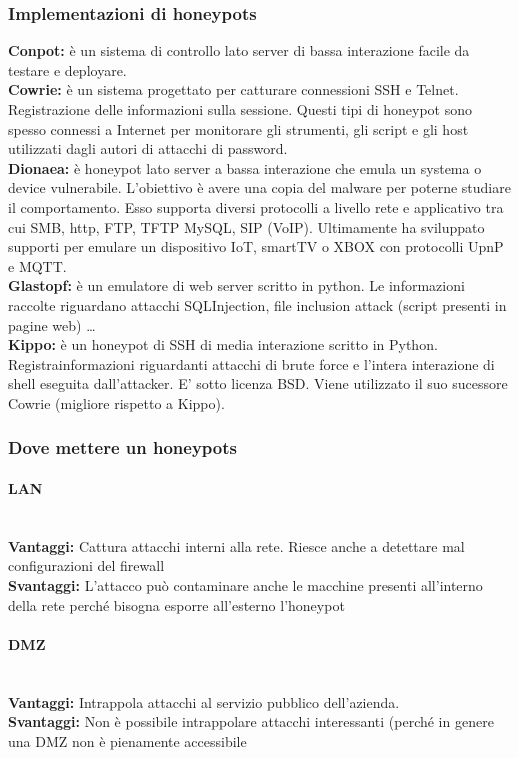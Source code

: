 \documentclass{article}
\begin{document}
\subsubsection{Implementazioni di honeypots}
\textbf{Conpot:} è un sistema di controllo lato server di bassa interazione facile da testare e deployare.\\
\textbf{Cowrie:} è un sistema progettato per catturare connessioni SSH e Telnet. Registrazione delle informazioni 
sulla sessione. Questi tipi di honeypot sono spesso connessi a Internet per monitorare gli strumenti, gli script e 
gli host utilizzati dagli autori di attacchi di password.\\
\textbf{Dionaea:} è honeypot lato server a bassa interazione che emula un systema o device vulnerabile. 
L’obiettivo è avere una copia del malware per poterne studiare il comportamento. Esso supporta diversi 
protocolli a livello rete e applicativo tra cui SMB, http, FTP, TFTP MySQL, SIP (VoIP). Ultimamente ha 
sviluppato supporti per emulare un dispositivo IoT, smartTV o XBOX con protocolli UpnP e MQTT.\\
\textbf{Glastopf:} è un emulatore di web server scritto in python. Le informazioni raccolte riguardano attacchi 
SQLInjection, file inclusion attack (script presenti in pagine web) \dots \\
\textbf{Kippo:} è un honeypot di SSH di media interazione scritto in Python. Registrainformazioni riguardanti 
attacchi di brute force e l’intera interazione di shell eseguita dall’attacker. E’ sotto licenza BSD. 
Viene utilizzato il suo sucessore Cowrie (migliore rispetto a Kippo).
\subsubsection{Dove mettere un honeypots}
\paragraph{LAN}
\noindent
\\
\textbf{Vantaggi:} Cattura attacchi interni alla rete. Riesce anche a detettare mal configurazioni del firewall \\
\textbf{Svantaggi:} L’attacco può contaminare anche le macchine presenti all’interno della rete perché bisogna 
esporre all’esterno l’honeypot 
\paragraph{DMZ}
\noindent
\\
\textbf{Vantaggi:} Intrappola attacchi al servizio pubblico dell’azienda.\\
\textbf{Svantaggi:} Non è possibile intrappolare attacchi interessanti (perché in genere una DMZ non è pienamente accessibile 
\end{document}
